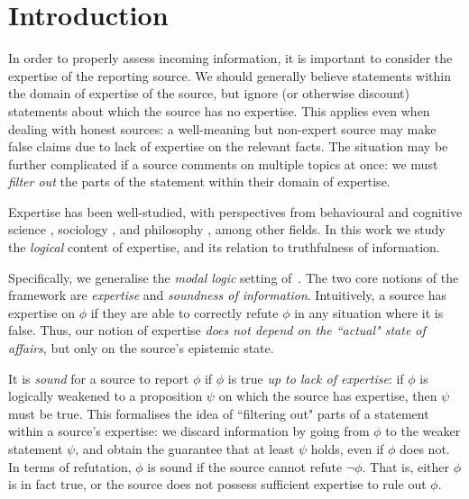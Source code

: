 \section{Introduction}

In order to properly assess incoming information, it is important to consider
the expertise of the reporting source. We should generally believe statements
within the domain of expertise of the source, but ignore (or otherwise
discount) statements about which the source has no expertise. This applies even
when dealing with honest sources: a well-meaning but non-expert source may make
false claims due to lack of expertise on the relevant facts.
%
The situation may be further complicated if a source comments on multiple
topics at once: we must \emph{filter out} the parts of the statement within
their domain of expertise.

Expertise has been well-studied, with perspectives from behavioural and
cognitive science \citep{chi2014nature,ericsson2010expertise}, sociology
\citep{collins2008rethinking}, and philosophy
\citep{kilov2021brittleness,whyte2010trust,goldman2018expertise}, among other
fields. In this work we study the \emph{logical} content of expertise, and its
relation to truthfulness of information.

Specifically, we generalise the \emph{modal logic} setting
of~\citet{singleton2021logic}. The two core notions of the framework are
\emph{expertise} and \emph{soundness of information}. Intuitively, a source has
expertise on $\phi$ if they are able to correctly refute $\phi$ in any
situation where it is false.\footnotemark{} Thus, our notion of expertise
\emph{does not depend on the ``actual" state of affairs}, but only on the
source's epistemic state.


It is \emph{sound} for a source to report $\phi$ if $\phi$ is true \emph{up to
lack of expertise}: if $\phi$ is logically weakened to a proposition $\psi$ on
which the source has expertise, then $\psi$ must be true. This formalises the
idea of ``filtering out" parts of a statement within a source's expertise: we
discard information by going from $\phi$ to the weaker statement $\psi$, and
obtain the guarantee that at least $\psi$ holds, even if $\phi$ does not.
%
In terms of refutation, $\phi$ is sound if the source cannot refute $\neg\phi$.
That is, either $\phi$ is in fact true, or the source does not possess
sufficient expertise to rule out $\phi$.

